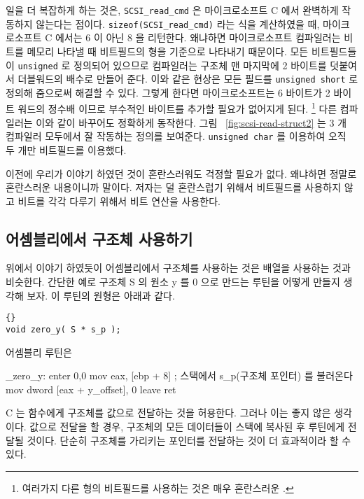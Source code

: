 일을 더 복잡하게 하는 것은, \lstinline|SCSI_read_cmd| 은 마이크로소프트 C 에서 완벽하게 작동하지 않는다는 점이다. 
\lstinline|sizeof(SCSI_read_cmd)| 라는 식을 계산하였을 때, 마이크로소프트 C 에서는
6 이 아닌 8 을 리턴한다. 왜냐하면 마이크로소프트 컴파일러는 비트를 메모리 나타낼 때
비트필드의 형을 기준으로 나타내기 때문이다. 모든 비트필드들이 \lstinline|unsigned| 로
정의되어 있으므로 컴파일러는 구조체 맨 마지막에 2 바이트를 덧붙여서 더블워드의 배수로
만들어 준다. 이와 같은 현상은 모든 필드를 \lstinline|unsigned short| 로 정의해 줌으로써
해결할 수 있다. 그렇게 한다면 마이크로소프트는 6 바이트가 2 바이트 워드의 정수배 이므로
부수적인 바이트를 추가할 필요가 없어지게 된다. 
\footnote{여러가지 다른 형의 비트필드를 사용하는 것은 매우 혼란스러운 .} 
다른 컴파일러는 이와 같이 바꾸어도 정확하게 동작한다. 그림 ~\ref{fig:scsi-read-struct2} 는 
3 개 컴파일러 모두에서 잘 작동하는 정의를 보여준다. \lstinline|unsigned char| 를 이용하여
오직 두 개만 비트필드를 이용했다. 


이전에 우리가 이야기 하였던 것이 혼란스러워도 걱정할 필요가 없다. 왜냐하면 정말로
혼란스러운 내용이니까 말이다. 저자는 덜 혼란스럽기 위해서 비트필드를 사용하지 않고
비트를 각각 다루기 위해서 비트 연산을 사용한다. 



\subsection{어셈블리에서 구조체 사용하기}

위에서 이야기 하였듯이 어셈블리에서 구조체를 사용하는 것은 배열을 사용하는 것과
비슷한다. 간단한 예로 구조체 {\code S} 의 원소 {\code y} 를 0 으로 만드는 루틴을
어떻게 만들지 생각해 보자. 이 루틴의 원형은 아래과 같다. 

\begin{lstlisting}[stepnumber=0]{}
void zero_y( S * s_p );
\end{lstlisting}
\noindent 어셈블리 루틴은 
\begin{AsmCodeListing}
_zero_y:
      enter  0,0
      mov    eax, [ebp + 8]      ; 스택에서 s_p(구조체 포인터) 를 불러온다
      mov    dword [eax + y_offset], 0
      leave
      ret
\end{AsmCodeListing}

C 는 함수에게 구조체를 값으로 전달하는 것을 허용한다. 그러나 이는 좋지 않은 생각이다. 
값으로 전달을 할 경우, 구조체의 모든 데이터들이 스택에 복사된 후 루틴에게 전달될 것이다.
단순히 구조체를 가리키는 포인터를 전달하는 것이 더 효과적이라 할 수 있다. 

